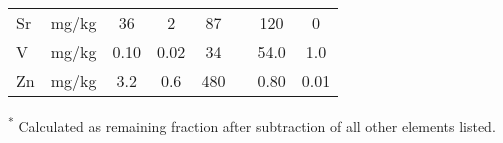 \begin{table}
{\begin{threeparttable}
\begin{tabular}{lccccccc}
Sr                        & mg/kg     & 36                & 2                & 87               &                   & 120             & 0                  \\
V                         & mg/kg     & 0.10              & 0.02             & 34               &                   & 54.0            & 1.0                \\
Zn                        & mg/kg     & 3.2               & 0.6              & 480              &                   & 0.80            & 0.01      \\ \bottomrule   
\end{tabular}
\begin{tablenotes}
\item \textsuperscript{*} Calculated as remaining fraction after subtraction of all other elements listed.
\end{tablenotes}
\end{threeparttable}}
\end{table}

